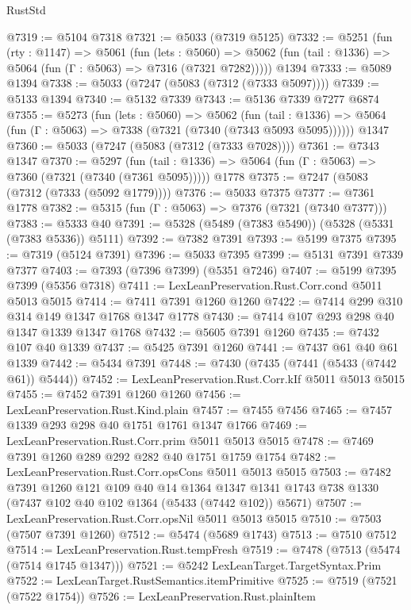 \begin{lexlean}{RustStd}
\begin{coremodule}
{\begin{coremodule}
{{{{{{{{{{{{{{{{{{{{{{{{{{{{{{{{{{@7319 := @5104 @7318
@7321 := @5033 (@7319 @5125)
@7332 := @5251
    (fun (rty : @1147) =>
    @5061
      (fun (lets : @5060) =>
      @5062 (fun (tail : @1336) => @5064 (fun (Γ : @5063) => @7316 (@7321 @7282)))))
    @1394
@7333 := @5089 @1394
@7338 := @5033 (@7247 (@5083 (@7312 (@7333 @5097))))
@7339 := @5133 @1394
@7340 := @5132 @7339
@7343 := @5136 @7339 @7277 @6874
@7355 := @5273
    (fun (lets : @5060) =>
    @5062
      (fun (tail : @1336) => @5064 (fun (Γ : @5063) => @7338 (@7321 (@7340 (@7343 @5093 @5095))))))
    @1347
@7360 := @5033 (@7247 (@5083 (@7312 (@7333 @7028))))
@7361 := @7343 @1347
@7370 := @5297
    (fun (tail : @1336) => @5064 (fun (Γ : @5063) => @7360 (@7321 (@7340 (@7361 @5095)))))
    @1778
@7375 := @7247 (@5083 (@7312 (@7333 (@5092 @1779))))
@7376 := @5033 @7375
@7377 := @7361 @1778
@7382 := @5315 (fun (Γ : @5063) => @7376 (@7321 (@7340 @7377)))
@7383 := @5333 @40
@7391 := @5328 (@5489 (@7383 @5490)) (@5328 (@5331 (@7383 @5336)) @5111)
@7392 := @7382 @7391
@7393 := @5199 @7375
@7395 := @7319 (@5124 @7391)
@7396 := @5033 @7395
@7399 := @5131 @7391 @7339 @7377
@7403 := @7393 (@7396 @7399) (@5351 @7246)
@7407 := @5199 @7395 @7399 (@5356 @7318)
@7411 := LexLeanPreservation.Rust.Corr.cond @5011 @5013 @5015
@7414 := @7411 @7391 @1260 @1260
@7422 := @7414 @299 @310 @314 @149 @1347 @1768 @1347 @1778
@7430 := @7414 @107 @293 @298 @40 @1347 @1339 @1347 @1768
@7432 := @5605 @7391 @1260
@7435 := @7432 @107 @40 @1339
@7437 := @5425 @7391 @1260
@7441 := @7437 @61 @40 @61 @1339
@7442 := @5434 @7391
@7448 := @7430 (@7435 (@7441 (@5433 (@7442 @61)) @5444))
@7452 := LexLeanPreservation.Rust.Corr.kIf @5011 @5013 @5015
@7455 := @7452 @7391 @1260 @1260
@7456 := LexLeanPreservation.Rust.Kind.plain
@7457 := @7455 @7456
@7465 := @7457 @1339 @293 @298 @40 @1751 @1761 @1347 @1766
@7469 := LexLeanPreservation.Rust.Corr.prim @5011 @5013 @5015
@7478 := @7469 @7391 @1260 @289 @292 @282 @40 @1751 @1759 @1754
@7482 := LexLeanPreservation.Rust.Corr.opsCons @5011 @5013 @5015
@7503 := @7482
    @7391
    @1260
    @121
    @109
    @40
    @14
    @1364
    @1347
    @1341
    @1743
    @738
    @1330
    (@7437 @102 @40 @102 @1364 (@5433 (@7442 @102)) @5671)
@7507 := LexLeanPreservation.Rust.Corr.opsNil @5011 @5013 @5015
@7510 := @7503 (@7507 @7391 @1260)
@7512 := @5474 (@5689 @1743)
@7513 := @7510 @7512
@7514 := LexLeanPreservation.Rust.tempFresh
@7519 := @7478 (@7513 (@5474 (@7514 @1745 @1347)))
@7521 := @5242 LexLeanTarget.TargetSyntax.Prim
@7522 := LexLeanTarget.RustSemantics.itemPrimitive
@7525 := @7519 (@7521 (@7522 @1754))
@7526 := LexLeanPreservation.Rust.plainItem
}}}}}}}}}}}}}}}}}}}}}}}}}}}}}}}}}}
\end{coremodule}}
\end{coremodule}
\end{lexlean}
